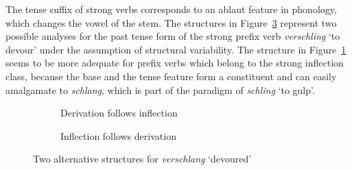 \documentclass[output=paper
  ,nobabel
  ,draftmode
  ,colorlinks, citecolor=brown
]{langscibook}
\begin{document}
\largerpage
The tense suffix of strong verbs corresponds to an ablaut feature in phonology, which changes the vowel of the stem. The structures in Figure~\ref{ex-verschlang} represent two possible analyses for the past tense form of the strong prefix verb \emph{verschling} `to devour' under the assumption of structural variability. The structure in Figure~\ref{ex-verschling} seems to be more adequate for prefix verbs which belong to the strong inflection class, because the base and the tense feature form a constituent and can easily amalgamate to \emph{schlang}, which is part of the paradigm of \emph{schling} `to gulp'.

\begin{figure}
\begin{subfigure}[b]{.48\textwidth}
\centering
{}
\caption{Derivation follows inflection}\label{ex-verschling}
\end{subfigure}
\begin{subfigure}[b]{.48\textwidth}
\centering
{}
\caption{Inflection follows derivation}\label{ex-verschling-b}
\end{subfigure}
\caption{Two alternative structures for \emph{verschlang} `devoured'}\label{ex-verschlang}
\end{figure}
\end{document}
